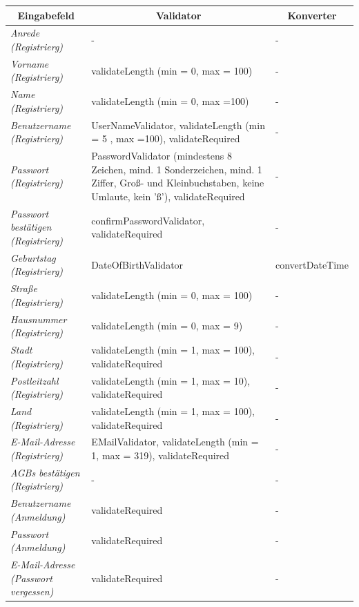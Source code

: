 \begin{itemize}
\begin{itemize}
				\begin{center}
					\begin{longtable}{|p{3cm} |p{8cm} | p{5cm}|}
						
						\hline \multicolumn{1}{|c|}{\textbf{Eingabefeld}} & \multicolumn{1}{|c|}{\textbf{Validator}} & \multicolumn{1}{|c|}{\textbf{Konverter}} \\ \hline
						\endfirsthead
						\hline
						\endlastfoot
						\textit{Anrede (Registrierg)} & - & -  \\ \hline
						\textit{Vorname (Registrierg)} & validateLength (min = 0, max = 100) & - \\ \hline
						\textit{Name (Registrierg)} & validateLength (min = 0, max =100) & -  \\ \hline
						\textit{Benutzername (Registrierg)} & UserNameValidator, validateLength (min = 5 , max =100), validateRequired  & - \\ \hline
						\textit{Passwort (Registrierg)} & PasswordValidator (mindestens 8 Zeichen, mind. 1 Sonderzeichen, mind. 1 Ziffer, Groß- und Kleinbuchstaben, keine Umlaute, kein 'ß'), validateRequired & -  \\ \hline
						\textit{Passwort bestätigen (Registrierg)} & confirmPasswordValidator, validateRequired & - \\ \hline
						\textit{Geburtstag (Registrierg)} & DateOfBirthValidator & convertDateTime  \\ \hline
						\textit{Straße (Registrierg)} & validateLength (min = 0, max = 100) & - \\ \hline
						\textit{Hausnummer (Registrierg)} & validateLength (min = 0, max = 9) & - \\ \hline
						\textit{Stadt (Registrierg)} & validateLength (min = 1, max = 100), validateRequired & -  \\ \hline
						\textit{Postleitzahl (Registrierg)} & validateLength (min = 1, max = 10), validateRequired & - \\ \hline
						\textit{Land (Registrierg)} & validateLength (min = 1, max = 100), validateRequired & -  \\ \hline
						\textit{E-Mail-Adresse (Registrierg)} & EMailValidator, validateLength (min = 1, max = 319), validateRequired & - \\ \hline
						\textit{AGBs bestätigen (Registrierg)} & - & -  \\ \hline
						\textit{Benutzername (Anmeldung)} & validateRequired & - \\ \hline
						\textit{Passwort (Anmeldung)} & validateRequired & -  \\ \hline
						\textit{E-Mail-Adresse (Passwort vergessen)} & validateRequired & - \\ \hline
					\end{longtable}
				\end{center}
				

\end{itemize}
\end{itemize}
